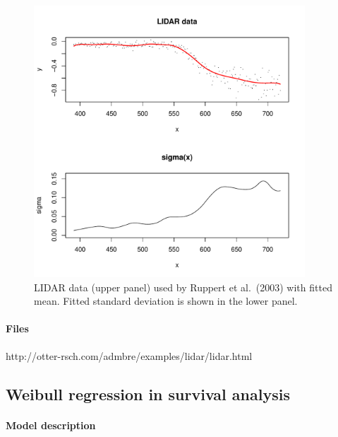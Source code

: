 \documentclass[12pt,letter,reqno]{book}
\begin{document}
\begin{figure}
  \centering
  \includegraphics[width=4in]{lidar_fig.pdf}
  \caption{LIDAR data (upper panel) used by Ruppert et al.\ (2003) with fitted
    mean. Fitted standard deviation is shown in the lower panel.}
  \label{fig:lidar}
\end{figure}

\paragraph{Files} http://otter-rsch.com/admbre/examples/lidar/lidar.html

\subsection{Weibull regression in survival analysis}
\paragraph{Model description}
\end{document}
